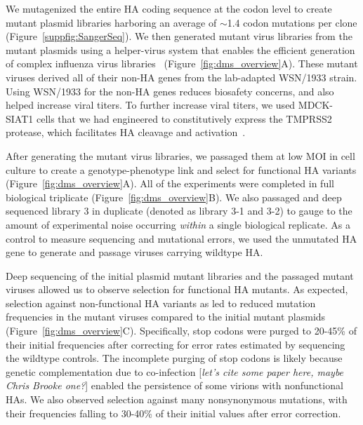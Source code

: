\documentclass[9pt,twocolumn,twoside]{pnas-new}
\newcommand{\comment}[1]{{\color{red}[\textsl{#1}]}}
\begin{document}
We mutagenized the entire HA coding sequence at the codon level to create mutant plasmid libraries harboring an average of $\sim$1.4 codon mutations per clone (Figure~\ref{suppfig:SangerSeq}).
We then generated mutant virus libraries from the mutant plasmids using a helper-virus system that enables the efficient generation of complex influenza virus libraries~\cite{doud2016accurate} (Figure~\ref{fig:dms_overview}A).
These mutant viruses derived all of their non-HA genes from the lab-adapted WSN/1933 strain.
Using WSN/1933 for the non-HA genes reduces biosafety concerns, and also helped increase viral titers.
To further increase viral titers, we used MDCK-SIAT1 cells that we had engineered to constitutively express the TMPRSS2 protease, which facilitates HA cleavage and activation~\cite{bottcher2006proteolytic, bottcher2010cleavage}.

After generating the mutant virus libraries, we passaged them at low MOI in cell culture to create a genotype-phenotype link and select for functional HA variants (Figure~\ref{fig:dms_overview}A).
All of the experiments were completed in full biological triplicate (Figure~\ref{fig:dms_overview}B). 
We also passaged and deep sequenced library 3 in duplicate (denoted as library 3-1 and 3-2) to gauge to the amount of experimental noise occurring \textit{within} a single biological replicate.
As a control to measure sequencing and mutational errors, we used the unmutated HA gene to generate and passage viruses carrying wildtype HA.

Deep sequencing of the initial plasmid mutant libraries and the passaged mutant viruses allowed us to observe selection for functional HA mutants.
As expected, selection against non-functional HA variants as led to reduced mutation frequencies in the mutant viruses compared to the initial mutant plasmids (Figure~\ref{fig:dms_overview}C).
Specifically, stop codons were purged to 20-45\% of their initial frequencies after correcting for error rates estimated by sequencing the wildtype controls.
The incomplete purging of stop codons is likely because genetic complementation due to co-infection \comment{let's cite some paper here, maybe Chris Brooke one?} enabled the persistence of some virions with nonfunctional HAs. 
We also observed selection against many nonsynonymous mutations, with their frequencies falling to 30-40\% of their initial values after error correction.
\end{document}
